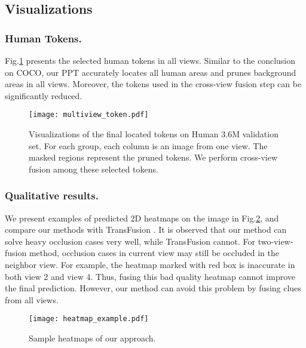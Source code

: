 \documentclass[runningheads]{llncs}
\begin{document}
\vspace{-0.5em}
\subsection{Visualizations}
\vspace{-0.5em}

\subsubsection{Human Tokens. }
Fig.\ref{fig:human_mask_multi} presents the selected human tokens in all views. 
Similar to the conclusion on COCO, our PPT accurately locates all human areas and prunes background areas in all views. 
Moreover, the tokens used in the cross-view fusion step can be significantly reduced. 



\begin{figure}[t]
    \centering
    \texttt{[image: multiview\_token.pdf]}
    \caption{
    \small{Visualizations of the final located tokens on Human 3.6M validation set. For each group, each column is an image from one view. The masked regions represent the pruned tokens. We perform cross-view fusion among these selected tokens. }
    }
    \label{fig:human_mask_multi}
\end{figure}




\vspace{-0.5em}
\subsubsection{Qualitative results. }
We present examples of predicted 2D heatmaps on the image in Fig.\ref{fig:heatmap_sample}, and compare our methods with TransFusion \cite{ma2021transfusion}. It is observed that our method can solve heavy occlusion cases very well, while TransFusion cannot.  
For two-view-fusion method, occlusion cases in current view may still be occluded in the neighbor view. For example, the heatmap marked with red box is inaccurate in both view 2 and view 4. Thus, fusing this bad quality heatmap cannot improve the final prediction. 
However, our method can avoid this problem by fusing clues from all views.

\begin{figure}[t]
    \centering
    \texttt{[image: heatmap\_example.pdf]}
    \caption{\small{Sample heatmaps of our approach.} }
    \label{fig:heatmap_sample}
\end{figure}
\end{document}
